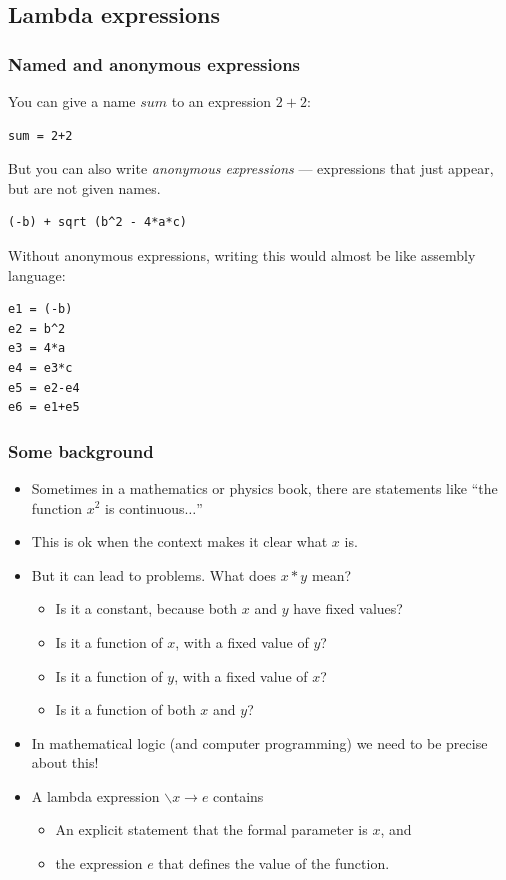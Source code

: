 \documentclass{beamer}
\begin{document}
\subsection{Lambda expressions}

\begin{frame}[fragile]
\frametitle{Named and anonymous expressions}

You can give a name $sum$ to an expression $2+2$:

\begin{verbatim}
sum = 2+2
\end{verbatim}

But you can also write \emph{anonymous expressions} --- expressions
that just appear, but are not given names.

\begin{verbatim}
(-b) + sqrt (b^2 - 4*a*c)
\end{verbatim}

Without anonymous expressions, writing this would almost be like
assembly language:

\begin{verbatim}
e1 = (-b)
e2 = b^2
e3 = 4*a
e4 = e3*c
e5 = e2-e4
e6 = e1+e5
\end{verbatim}

\end{frame}

\begin{frame}
\frametitle{Some background}

\begin{itemize}
\item Sometimes in a mathematics or physics book, there are
  statements like ``the function $x^2$ is continuous$\ldots$''
\item This is ok when the context makes it clear what $x$ is.
\item But it can lead to problems.  What does $x*y$ mean?
  \begin{itemize}
  \item Is it a constant, because both $x$ and $y$ have fixed
    values?
  \item Is it a function of $x$, with a fixed value of $y$?
  \item Is it a function of $y$, with a fixed value of $x$?
  \item Is it a function of both $x$ and $y$?
  \end{itemize}
\item In mathematical logic (and computer programming) we need to
  be precise about this!
\item A lambda expression $\backslash x \rightarrow e$ contains
  \begin{itemize}
  \item An explicit statement that the formal parameter is $x$, and
  \item the expression $e$ that defines the value of the function.
  \end{itemize}
\end{itemize}

\end{frame}
\end{document}
